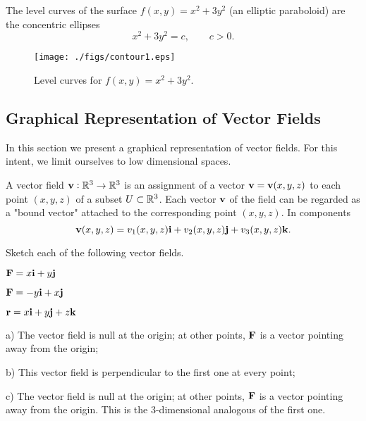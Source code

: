 \begin{exa}
The level curves of the surface $f(x,y)=x^2+3y^2$ (an elliptic paraboloid) are the concentric ellipses
$$x^2+3y^2 = c,  \qquad c>0. $$
\end{exa}
\begin{figure}[h]
 \centering
 \texttt{[image: ./figs/contour1.eps]}
 \caption{Level curves for $f(x,y)=x^2+3y^2$.}
 \label{fig:contour}
\end{figure}




\subsection{Graphical Representation of Vector Fields}

In this section we present a graphical representation of vector fields. 
For this intent, we limit ourselves to low dimensional spaces.

A vector field $\mathbf{ v}:\mathbb{R}^3\to \mathbb{R}^3$ is an assignment of a vector  $\mathbf{ v} = \mathbf{ v}(x , y , z)$  
to each point $(x , y , z)$ of a subset $U\subset \mathbb{R}^3$. Each vector $\mathbf{ v}$ of the field can be regarded
as a "bound vector" attached to the corresponding point $( x , y , z)$.  In components
\[\mathbf{ v}(x,y,z)=v_1(x,y,z)\mathbf{ i}+v_2(x,y,z)\mathbf{ j}+v_3(x,y,z)\mathbf{ k}.\]


\begin{exa}
 Sketch each of the following vector fields.
 \item $\mathbf{ F}=x\mathbf{ i}+y\mathbf{ j}$
 \item $\mathbf{ F}=-y\mathbf{ i}+x\mathbf{ j}$
 \item $ \mathbf r = x\mathbf{ i} + y \mathbf{ j} + z\mathbf{ k}$
\end{exa}

\begin{solu}

a) The vector field is null at the origin; at other points, $\mathbf{ F}$
is a vector pointing away from the origin;

b) This vector field is perpendicular to the first one at every point;

c) The vector field is null at the origin; at other points, $\mathbf{ F}$
is a vector pointing away from the origin. This is the $3$-dimensional 
analogous of the first one.
\end{solu}



